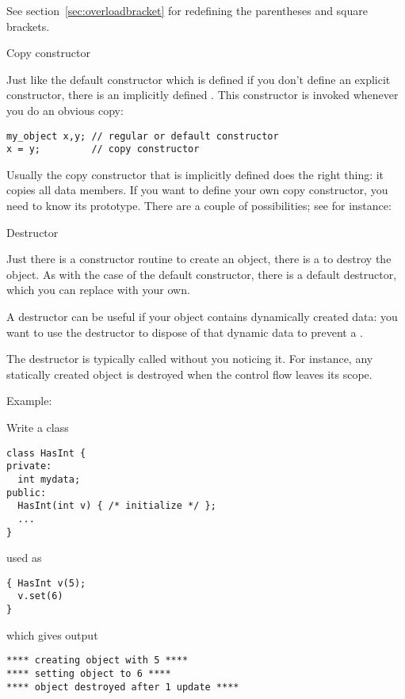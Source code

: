 See section~\ref{sec:overloadbracket} for redefining the parentheses
and square brackets.

 {Copy constructor}

Just like the default constructor which is defined if you don't define
an explicit constructor, there is an implicitly defined
. This constructor is invoked whenever
you do an obvious copy:
\begin{verbatim}
my_object x,y; // regular or default constructor
x = y;         // copy constructor
\end{verbatim}
Usually the copy constructor that is implicitly defined does the right
thing: it copies all data members. If you want to define your own copy
constructor, you need to know its prototype. There are a couple of
possibilities; see for instance:
%

 {Destructor}

Just there is a constructor routine to create an object, there is a
 to destroy the object.
As with the case of the default constructor, there is a default
destructor, which you can replace with your own.

A destructor can be useful if your object contains dynamically created
data: you want to use the destructor to dispose of that dynamic data
to prevent a .

The destructor is typically called without you noticing it. For
instance, any statically created object is destroyed when the control
flow leaves its scope.

Example:
%


\begin{exercise}
  \label{ex:destruct-trace}
  Write a class
\begin{verbatim}
class HasInt {
private:
  int mydata;
public:
  HasInt(int v) { /* initialize */ };
  ...
}
\end{verbatim}
used as
\begin{verbatim}
{ HasInt v(5);
  v.set(6)
}
\end{verbatim}
which gives output
\begin{verbatim}
**** creating object with 5 ****
**** setting object to 6 ****
**** object destroyed after 1 update ****
\end{verbatim}
\end{exercise}



